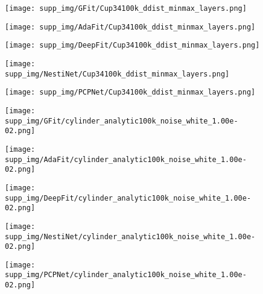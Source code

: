 \documentclass[runningheads]{llncs}
\begin{document}
\begin{figure*}
\begin{subfigure}{0.15\linewidth}
		\centering
		\texttt{[image: supp\_img/GFit/Cup34100k\_ddist\_minmax\_layers.png]}
\end{subfigure}
	\hspace{0.1cm}
	\begin{subfigure}{0.15\linewidth}
		\centering
		\texttt{[image: supp\_img/AdaFit/Cup34100k\_ddist\_minmax\_layers.png]}
\end{subfigure}
	\hspace{0.1cm}
	\begin{subfigure}{0.17\linewidth}
		\centering
		\texttt{[image: supp\_img/DeepFit/Cup34100k\_ddist\_minmax\_layers.png]}
\end{subfigure}
	\hspace{0.1cm}
	\begin{subfigure}{0.17\linewidth}
		\centering
		\texttt{[image: supp\_img/NestiNet/Cup34100k\_ddist\_minmax\_layers.png]}
\end{subfigure}
	\hspace{0.1cm}
	\begin{subfigure}{0.17\linewidth}
		\centering
		\texttt{[image: supp\_img/PCPNet/Cup34100k\_ddist\_minmax\_layers.png]}
\end{subfigure}
	
\begin{subfigure}{0.15\linewidth}
		\centering
		\texttt{[image: supp\_img/GFit/cylinder\_analytic100k\_noise\_white\_1.00e-02.png]}
\end{subfigure}
	\hspace{0.1cm}
	\begin{subfigure}{0.15\linewidth}
		\centering
		\texttt{[image: supp\_img/AdaFit/cylinder\_analytic100k\_noise\_white\_1.00e-02.png]}
\end{subfigure}
	\hspace{0.1cm}
	\begin{subfigure}{0.17\linewidth}
		\centering
		\texttt{[image: supp\_img/DeepFit/cylinder\_analytic100k\_noise\_white\_1.00e-02.png]}
\end{subfigure}
	\hspace{0.1cm}
	\begin{subfigure}{0.17\linewidth}
		\centering
		\texttt{[image: supp\_img/NestiNet/cylinder\_analytic100k\_noise\_white\_1.00e-02.png]}
\end{subfigure}
	\hspace{0.1cm}
	\begin{subfigure}{0.17\linewidth}
		\centering
		\texttt{[image: supp\_img/PCPNet/cylinder\_analytic100k\_noise\_white\_1.00e-02.png]}
\end{subfigure}
	

\end{figure*}
\end{document}
